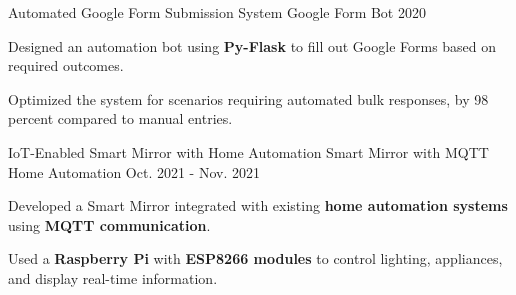 \begin{cventries}
  \cventry
    {Automated Google Form Submission System} %
    {Google Form Bot} %
    {}%
    {2020} %
    {
      \begin{cvitems} %
        \item {Designed an automation bot using \textbf{Py-Flask} to fill out Google Forms based on required outcomes.}
        \item {Optimized the system for scenarios requiring automated bulk responses, by 98 percent compared to manual entries.}
      \end{cvitems}
    }

  \cventry
    {IoT-Enabled Smart Mirror with Home Automation} %
    {Smart Mirror with MQTT Home Automation} %
    {}%
    {Oct. 2021 - Nov. 2021} %
    {
      \begin{cvitems} %
        \item {Developed a Smart Mirror integrated with existing \textbf{home automation systems} using \textbf{MQTT communication}.}
        \item {Used a \textbf{Raspberry Pi} with \textbf{ESP8266 modules} to control lighting, appliances, and display real-time information.}
      \end{cvitems}
    }

\end{cventries}
